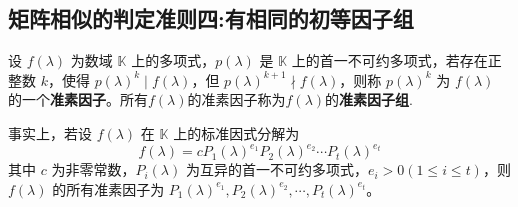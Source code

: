 \documentclass[../../main.tex]{subfiles}%
\begin{document}
\subsection{矩阵相似的判定准则四:有相同的初等因子组}

\begin{definition}[准素因子]\label{definition:一般数域上的的准素因子}
设 \(f(\lambda)\) 为数域 \(\mathbb{K}\) 上的多项式，\(p(\lambda)\) 是 \(\mathbb{K}\) 上的首一不可约多项式，若存在正整数 \(k\)，使得 \(p(\lambda)^k\mid f(\lambda)\)，但 \(p(\lambda)^{k + 1}\nmid f(\lambda)\)，则称 \(p(\lambda)^k\) 为 \(f(\lambda)\) 的一个\textbf{准素因子}。所有$f(\lambda)$的准素因子称为$f(\lambda)$的\textbf{准素因子组}.

事实上，若设 \(f(\lambda)\) 在 \(\mathbb{K}\) 上的标准因式分解为
\[
f(\lambda)=cP_1(\lambda)^{e_1}P_2(\lambda)^{e_2}\cdots P_t(\lambda)^{e_t}
\]
其中 \(c\) 为非零常数，\(P_i(\lambda)\) 为互异的首一不可约多项式，\(e_i>0(1\leqslant  i\leqslant  t)\)，则 \(f(\lambda)\) 的所有准素因子为 \(P_1(\lambda)^{e_1},P_2(\lambda)^{e_2},\cdots,P_t(\lambda)^{e_t}\)。
\end{definition}
\end{document}
